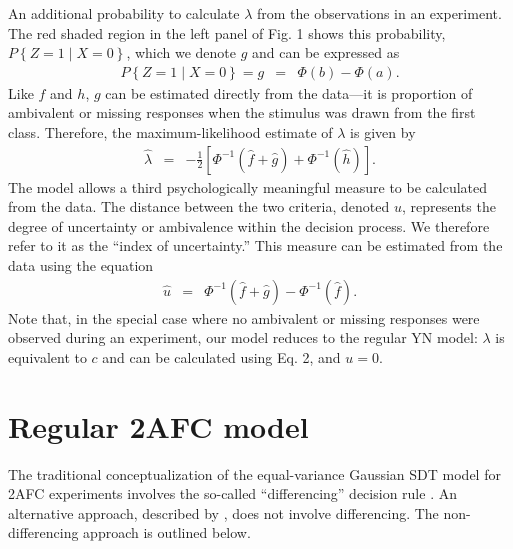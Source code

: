 \documentclass[man]{apa6}
\begin{document}
An additional probability to calculate $\lambda$ from the observations in an experiment. The red shaded region in the left panel of Fig. 1 shows this probability, $P\left\{Z=1\mid{}X=0\right\}$, which we denote $g$ and can be expressed as\begin{eqnarray*}
P\left\{Z=1\mid{}X=0\right\}=g&=&\Phi\left(b\right)-\Phi\left(a\right)\textrm{.}
\end{eqnarray*}
Like $f$ and $h$, $g$ can be estimated directly from the data---it is proportion of ambivalent or missing responses when the stimulus was drawn from the first class. Therefore, the maximum-likelihood estimate of $\lambda$ is given by
\begin{eqnarray}
\hat{\lambda}&=&-\frac{1}{2}\left[\Phi^{-1}\left(\hat{f}+\hat{g}\right)+\Phi^{-1}\left(\hat{h}\right)\right]\textrm{.}
\end{eqnarray}The model allows a third psychologically meaningful measure to be calculated from the data. The distance between the two criteria, denoted $u$, represents the degree of uncertainty or ambivalence within the decision process. We therefore refer to it as the ``index of uncertainty.'' This measure can be estimated from the data using the equation
\begin{eqnarray}
\hat{u}&=&\Phi^{-1}\left(\hat{f}+\hat{g}\right)-\Phi^{-1}\left(\hat{f}\right)\textrm{.}
\end{eqnarray}Note that, in the special case where no ambivalent or missing responses were observed during an experiment, our model reduces to the regular YN model: $\lambda$ is equivalent to $c$ and can be calculated using Eq. 2, and $u=0$.
\section{Regular 2AFC model}
The traditional conceptualization of the equal-variance Gaussian SDT model for 2AFC experiments involves the so-called ``differencing'' decision rule \parencite[see][]{Macmillan2005}. An alternative approach, described by \textcite{decarloon2012}, does not involve differencing. The non-differencing approach is outlined below.
\end{document}
